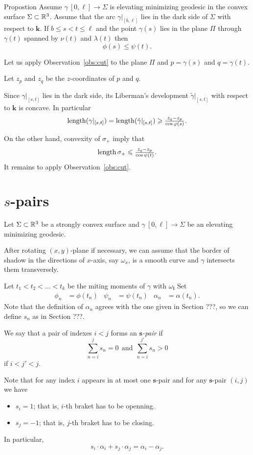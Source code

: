 \documentclass[a4paper,10pt]{amsart}
\begin{document}
\begin{thm}{Propostion}\label{prop:phi-psi}
Assume $\gamma\:[0,\ell]\to \Sigma$ is elevating minimizing geodesic in the convex surface $\Sigma\subset \mathbb{R}^3$.
Assume that the arc $\gamma|_{[b,\ell]}$ lies in the dark side of $\Sigma$ with respect to $\bm{k}$.
If $b\le s<t\le \ell$ and the point $\gamma(s)$ lies in the plane $\Pi$ through $\gamma(t)$ spanned by $\nu(t)$ and $\lambda(t)$
then 
\[\phi(s)\le \psi(t).\]
\end{thm}

Let us apply Observation~\ref{obs:cut} to the plane $\Pi$ and $p=\gamma(s)$ and $q=\gamma(t)$.

Let $z_p$ and $z_q$ be the $z$-coordinates of $p$ and $q$.

Since $\gamma|_{[s,t]}$ lies in the dark side,
its Liberman's development $\tilde\gamma|_{[s,t]}$ 
with respect to $\bm{k}$ is concave.
In particular 
\[\mathop{\rm length}\nolimits(\gamma|_{[s,t]})
=
\mathop{\rm length}\nolimits(\tilde\gamma|_{[s,t]})
\geqslant
\tfrac{z_q-z_p}{\cos\varphi(s)}.\]

On the other hand, convexity of $\sigma_+$ imply that
\[\mathop{\rm length}\nolimits\sigma_+\leqslant \tfrac{z_q-z_p}{\cos\psi(t)}.\]
It remains to apply Observation~\ref{obs:cut}.
\qeds

\section{$s$-pairs}

Let $\Sigma\subset \mathbb{R}^3$ 
be a strongly convex surface
and $\gamma\:[0,\ell]\to\Sigma$ be an elevating minimizing geodesic.

After rotating $(x,y)$-plane if necessary, 
we can assume that the border of shadow in the directions of $x$-axis, say $\omega_x$, 
is a smooth curve and $\gamma$ intersects them transversely.

Let $t_1<t_2<\dots<t_k$ be the miting moments of $\gamma$ with $\omega_{\bm{i}}$
Set
\begin{align*}
\phi_n&=\phi(t_n)
&
\psi_n&=\psi(t_n)
&
\alpha_n&=\alpha(t_n).
\end{align*}
Note that the definition of $\alpha_n$ agrees with the one given in Section ???, so we can define $s_n$ as in Section ???.

We say that a pair of indexes $i<j$
forms an \emph{$\bm{s}$-pair} 
if 
\[
\sum_{n=i}^js_n=0\ \ 
\text{and}\ \ 
\sum_{n=i}^{j'}s_n>0
\]
if $i<j'<j$.

Note that for any index $i$ appears in at most one $\bm{s}$-pair and 
for any $\bm{s}$-pair $(i,j)$ we have
\begin{itemize}
\item $s_i=1$; that is, $i$-th braket has to be openning.
 \item $s_j=-1$; that is, $j$-th braket has to be closing.
\end{itemize}
In particular,
\[s_i\cdot\alpha_i+s_j\cdot\alpha_j=\alpha_i-\alpha_j.\]
\end{document}
